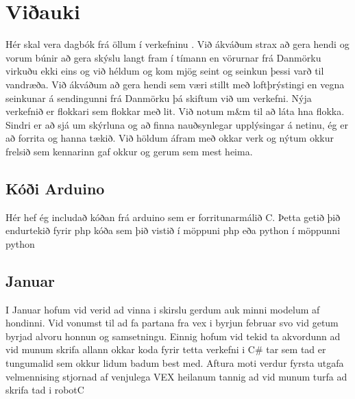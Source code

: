\section{Viðauki}
Hér skal vera dagbók frá öllum í verkefninu .
Við ákváðum strax að gera hendi og vorum búnir að gera skýslu langt fram í tímann en vörurnar frá Danmörku virkuðu ekki eins og við héldum og kom mjög seint og seinkun þessi varð til vandræða.
Við ákváðum að gera hendi sem væri stillt með loftþrýstingi en vegna seinkunar á sendingunni frá Danmörku þá skiftum við um verkefni.
Nýja verkefnið er flokkari sem flokkar með lit. Við notum m&m til að láta hna flokka.
Sindri er að sjá um skýrluna og að finna nauðsynlegar upplýsingar á netinu, ég er að forrita og hanna tækið.
Við höldum áfram með okkar verk og nýtum okkur frelsið sem kennarinn gaf okkur og gerum sem mest heima.

\begingroup
\obeylines

\endgroup
\subsection{Kóði Arduino}
Hér hef ég includað kóðan frá arduino sem er forritunarmálið C. Þetta getið þið endurtekið fyrir php kóða sem þið vistið í möppuni php eða python í möppunni python
\subsection{Januar}
I Januar hofum vid verid ad vinna i skirslu gerdum auk minni modelum af hondinni. Vid vonumst til ad fa partana fra vex i byrjun februar svo vid getum byrjad alvoru honnun og samsetningu. Einnig hofum vid tekid ta akvordunn ad vid munum skrifa allann okkar koda fyrir tetta verkefni i C# tar sem tad er tungumalid sem okkur lidum badum best med. Aftura moti verdur fyrsta utgafa velmennising stjornad af venjulega VEX heilanum tannig ad vid munum turfa ad skrifa tad i robotC
\begingroup

\endgroup
